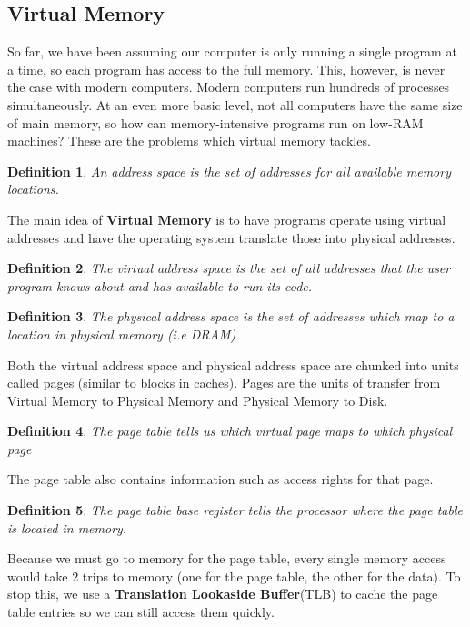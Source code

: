 \documentclass{article}
\newtheorem{definition}{Definition}
\begin{document}
\subsection{Virtual Memory}
So far, we have been assuming our computer is only running a single program at a time, so each program has access to the full memory. This, however, is never the case with modern computers.
Modern computers run hundreds of processes simultaneously. At an even more basic level, not all computers have the same size of main memory, so how can memory-intensive programs run on low-RAM machines?
These are the problems which virtual memory tackles.
\begin{definition}
    An address space is the set of addresses for all available memory locations.
\end{definition}
The main idea of \textbf{Virtual Memory} is to have programs operate using virtual addresses and have the operating system
translate those into physical addresses.
\begin{definition}
    The virtual address space is the set of all addresses that the user program knows about and has available to run its code.
\end{definition}
\begin{definition}
    The physical address space is the set of addresses which map to a location in physical memory (i.e DRAM)
\end{definition}
Both the virtual address space and physical address space are chunked into units called pages (similar to blocks in caches).
Pages are the units of transfer from Virtual Memory to Physical Memory and Physical Memory to Disk.
\begin{definition}
    The page table tells us which virtual page maps to which physical page
\end{definition}
The page table also contains information such as access rights for that page.
\begin{definition}
    The page table base register tells the processor where the page table is located in memory.
\end{definition}
Because we must go to memory for the page table, every single memory access would take 2 trips to memory (one for the page table, the other for the data).
To stop this, we use a \textbf{Translation Lookaside Buffer}(TLB) to cache the page table entries so we can still access them quickly.
\end{document}
